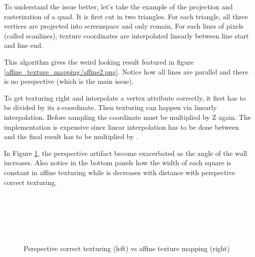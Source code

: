 To understand the issue better, let's take the example of the projection and rasterization of a quad. It is first cut in two triangles. For each triangle, all three vertices  are projected into screenspace and only  remain, For each lines of pixels (called scanlines), texture coordinates are interpolated linearly between line start and line end.\\
\par
This algorithm gives the weird looking result featured in figure \ref{affine_texture_mapping/affine2.png}. Notice how all lines are parallel and there is no perspective (which is the main issue).\\
\par
{}
\par
To get texturing right and interpolate a vertex attribute correctly, it first has to be divided by its z-coordinate. Then texturing can happen via linearly interpolation. Before sampling the coordinate must be multiplied by Z again. The implementation is expensive since linear interpolation has to be done between  and the final result has to be multiplied by .\\
\par
In Figure \ref{texture_anmgle}, the perspective artifact become exacerbated as the angle of the wall increases. Also notice in the bottom panels how the width of each square is constant in affine texturing while is decreases with distance with perspective correct texturing.\\ 
\pagebreak




\par
\begin{figure}[H] \centering
\begin{minipage}{\textwidth}
 \hspace{2cm}
\\
\par

 \hspace{2cm}
\\
\par

 \hspace{2cm}
\\
\par
\end{minipage}
\caption{Perspective correct texturing (left) vs affine texture mapping (right)}
\label{texture_anmgle}
\end{figure}
\par

